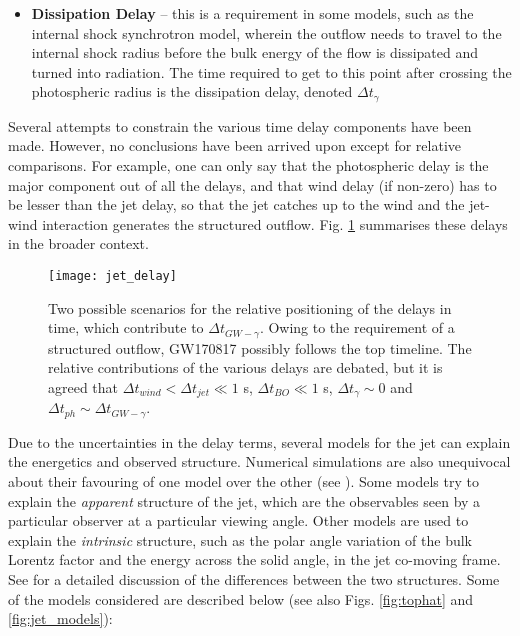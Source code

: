 \begin{itemize}
        \item \textbf{Dissipation Delay} -- this is a requirement in some models, such
            as the internal shock synchrotron model, wherein the outflow needs to travel
            to the internal shock radius before the bulk energy of the flow is
            dissipated and turned into radiation. The time required to get to this point
            after crossing the photospheric radius is the dissipation delay, denoted
            $\Delta t_{\gamma}$

    \end{itemize}

    Several attempts to constrain the various time delay components have been made.
    However, no conclusions have been arrived upon except for relative comparisons.  For
    example, one can only say that the photospheric delay is the major component out of
    all the delays, and that wind delay (if non-zero) has to be lesser than the jet
    delay, so that the jet catches up to the wind and the jet-wind interaction generates
    the structured outflow. Fig. \ref{fig:jet_delay} summarises these delays in the
    broader context.

    \begin{figure}[H]
        \centering
        \texttt{[image: jet\_delay]}
        \caption[Relative Positions of Jet Delays]
             {
                Two possible scenarios for the relative positioning of the delays in
                time, which contribute to $\Delta t_{GW-\gamma}$.  Owing to the
                requirement of a structured outflow, GW170817 possibly follows the top
                timeline. The relative contributions of the various delays are debated,
                but it is agreed that $\Delta t_{wind} < \Delta t_{jet} \ll 1$ s,
                $\Delta t_{BO} \ll 1$ s, $\Delta t_{\gamma} \sim 0$ and $\Delta t_{ph}
                \sim \Delta t_{GW-\gamma}$.
             }
        \label{fig:jet_delay}
    \end{figure}

    Due to the uncertainties in the delay terms, several models for the jet can explain
    the energetics and observed structure. Numerical simulations are also unequivocal
    about their favouring of one model over the other (see \cite{shibata_2019}).
    Some models try to explain the \textit{apparent} structure of the jet, which are the
    observables seen by a particular observer at a particular viewing angle. Other
    models are used to explain the \textit{intrinsic} structure, such as the polar angle
    variation of the bulk Lorentz factor and the energy across the solid angle, in the
    jet co-moving frame. See \cite{salafia_2015} for a detailed discussion of
    the differences between the two structures. Some of the models considered are
    described below (see also Figs. \ref{fig:tophat} and \ref{fig:jet_models}):

